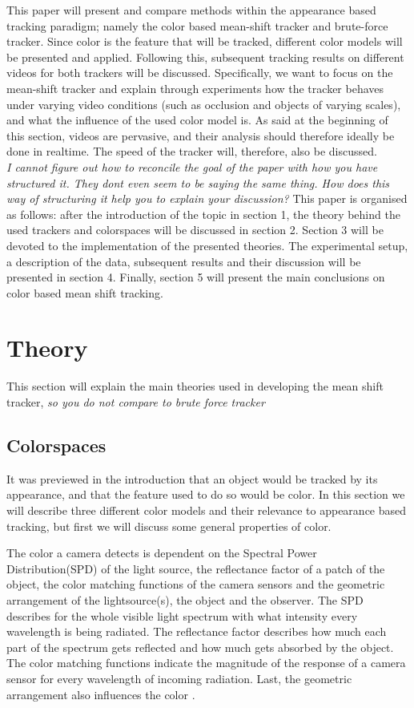 \documentclass[a4paper,11pt]{article}
\begin{document}
	This paper will present and compare methods within the appearance based tracking paradigm; namely the color based mean-shift tracker and brute-force tracker. 
	Since color is the feature that will be tracked, different color models will be presented and applied. Following this, subsequent tracking results on different videos for both trackers will be discussed.
	Specifically, we want to focus on the mean-shift tracker and explain through experiments how the tracker behaves under varying video conditions (such as occlusion and objects of varying scales), and what the influence of the used color model is.
	As said at the beginning of this section, videos are pervasive, and their analysis should therefore ideally be done in realtime. The speed of the tracker will, therefore, also be discussed. \\
\textit{I cannot figure out how to reconcile the goal of the paper with how you have structured it. They dont even seem to be saying the same thing. How does this way of structuring it help you to explain your discussion?}
	This paper is organised as follows:  after the introduction of the topic in section 1, the theory behind the used trackers and colorspaces will be discussed in section 2.
	Section 3 will be devoted to the implementation of the presented theories. The experimental setup, a description of the data, subsequent results and their discussion will be presented in section 4. 
	Finally, section 5 will present the main conclusions on color based mean shift tracking.

\section{Theory}	
	This section will explain the main theories used in developing the mean shift tracker, \textit{so you do not compare to brute force tracker} 
	\subsection{Colorspaces}
		It was previewed in the introduction that an object would be tracked by its appearance, and that the feature used to do so would be color. In this section we will describe three different color models and their relevance to appearance based tracking, but first we will discuss some general properties of color.

The color a camera detects is dependent on the Spectral Power Distribution(SPD) of the light source, the reflectance factor of a patch of the object, the color matching functions of the camera sensors and the geometric arrangement of the lightsource(s), the object and the observer. The SPD describes for the whole visible light spectrum with what intensity every wavelength is being radiated. The reflectance factor  describes how much each part of the spectrum gets reflected and how much gets absorbed by the object. The color matching functions indicate the magnitude of the response of a camera sensor for every wavelength of incoming radiation. Last, the geometric arrangement also influences the color \cite{gevers_color}.
\end{document}

